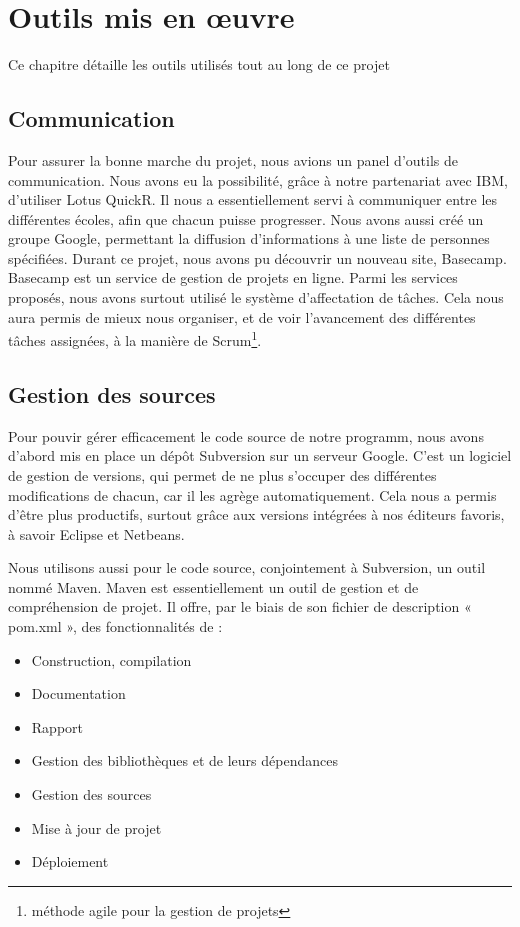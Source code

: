 \chapter{Outils mis en \oe{}uvre}
\minitoc

Ce chapitre détaille les outils utilisés tout au long de ce projet

\section{Communication}

Pour assurer la bonne marche du projet, nous avions un panel d’outils de communication.
Nous avons eu la possibilité, grâce à notre partenariat avec IBM, d’utiliser Lotus QuickR.
Il nous a essentiellement servi à communiquer entre les différentes écoles, afin que chacun puisse progresser.
Nous avons aussi créé un groupe Google, permettant la diffusion d’informations à une liste de personnes spécifiées.
Durant ce projet, nous avons pu découvrir un nouveau site, Basecamp.
Basecamp est un service de gestion de projets en ligne.
Parmi les services proposés, nous avons surtout utilisé le système d’affectation de tâches.
Cela nous aura permis de mieux nous organiser, et de voir l’avancement des différentes tâches assignées, à la manière de Scrum\footnote{méthode agile pour la gestion de projets}.

\section{Gestion des sources}

Pour pouvir gérer efficacement le code source de notre programm, nous avons d’abord mis en place un dépôt Subversion sur un serveur Google.
C’est un logiciel de gestion de versions, qui permet de ne plus s’occuper des différentes modifications de chacun, car il les agrège automatiquement.
Cela nous a permis d’être plus productifs, surtout grâce aux versions intégrées à nos éditeurs favoris, à savoir Eclipse et Netbeans.


Nous utilisons aussi pour le code source, conjointement à Subversion, un outil nommé Maven.
Maven est essentiellement un outil de gestion et de compréhension de projet.
Il offre, par le biais de son fichier de description « pom.xml »,  des fonctionnalités de :
\begin{itemize}
\item Construction, compilation
\item Documentation
\item Rapport
\item Gestion des bibliothèques et de leurs dépendances
\item Gestion des sources
\item Mise à jour de projet
\item Déploiement
\end{itemize}

